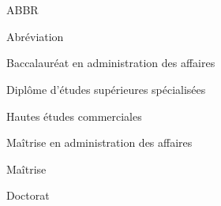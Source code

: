 \chapter*{\HECtdmAbreviations}

\begin{HECabbreviations}{ABBR}
\item[ABBR] Abréviation
\item[BAA] Baccalauréat en administration des affaires
\item[DESS] Diplôme d'études supérieures spécialisées
\item[HEC] Hautes études commerciales
\item[MBA] Maîtrise en administration des affaires
\item[MSc] Maîtrise
\item[PhD] Doctorat
\end{HECabbreviations}

